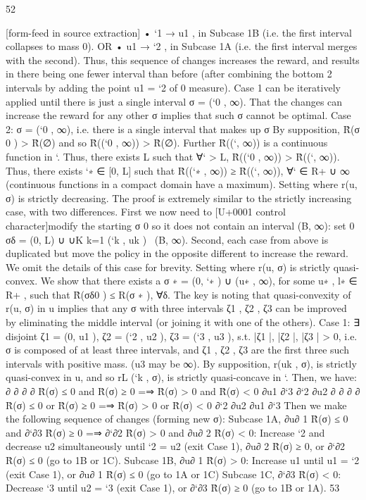 \documentclass[10pt]{article}
\begin{document}
\begin{ReviewVerbatim}
52


[form-feed in source extraction]
• `1 → u1 , in Subcase 1B (i.e. the first interval collapses to mass 0). OR
• u1 → `2 , in Subcase 1A (i.e. the first interval merges with the second).
Thus, this sequence of changes increases the reward, and results in there being one fewer interval
than before (after combining the bottom 2 intervals by adding the point u1 = `2 of 0 measure).
Case 1 can be iteratively applied until there is just a single interval σ = (`0 , ∞).
That the changes can increase the reward for any other σ implies that such σ cannot be optimal.
Case 2: σ = (`0 , ∞), i.e. there is a single interval that makes up σ
By supposition, R̂(σ 0 ) > R̂(∅) and so R̂((`0 , ∞)) > R̂(∅). Further R̂((`, ∞)) is a continuous
function in `. Thus, there exists L such that ∀` > L, R̂((`0 , ∞)) > R̂((`, ∞)).
Thus, there exists `∗ ∈ [0, L] such that R̂((`∗ , ∞)) ≥ R̂((`, ∞)), ∀` ∈ R+ ∪ {∞} (continuous
functions in a compact domain have a maximum).
Setting where r(u, σ) is strictly decreasing.
The proof is extremely similar to the strictly increasing case, with two differences.
First we now need to [U+0001 control character]modify the starting σ 0 so it does not contain an interval (B, ∞): set
0
σδ = (0, L) ∪ ∪K
k=1 (`k , uk ) \ (B, ∞).
Second, each case from above is duplicated but move the policy in the opposite different to
increase the reward. We omit the details of this case for brevity.
Setting where r(u, σ) is strictly quasi-convex.
We show that there exists a σ ∗ = (0, `∗ ) ∪ (u∗ , ∞), for some u∗ , l∗ ∈ R+ , such that R̂(σδ0 ) ≤
R(σ ∗ ), ∀δ.
The key is noting that quasi-convexity of r(u, σ) in u implies that any σ with three intervals
ζ1 , ζ2 , ζ3 can be improved by eliminating the middle interval (or joining it with one of the others).
Case 1: ∃ disjoint ζ1 = (0, u1 ), ζ2 = (`2 , u2 ), ζ3 = (`3 , u3 ), s.t. |ζ1 |, |ζ2 |, |ζ3 | > 0, i.e. σ is
composed of at least three intervals, and ζ1 , ζ2 , ζ3 are the first three such intervals with positive
mass. (u3 may be ∞).
By supposition, r(uk , σ), is strictly quasi-convex in u, and so rL (`k , σ), is strictly quasi-concave
in `.
Then, we have:
∂
∂
∂
∂
R̂(σ) ≤ 0 and
R̂(σ) ≥ 0 =⇒
R̂(σ) > 0 and
R̂(σ) < 0
∂u1
∂`3
∂`2
∂u2
∂
∂
∂
∂
R̂(σ) ≤ 0 or
R̂(σ) ≥ 0 =⇒
R̂(σ) > 0 or
R̂(σ) < 0
∂`2
∂u2
∂u1
∂`3
Then we make the following sequence of changes (forming new σ):
Subcase 1A, ∂u∂ 1 R̂(σ) ≤ 0 and ∂`∂3 R̂(σ) ≥ 0 =⇒ ∂`∂2 R̂(σ) > 0 and ∂u∂ 2 R̂(σ) < 0: Increase `2 and
decrease u2 simultaneously until `2 = u2 (exit Case 1), ∂u∂ 2 R̂(σ) ≥ 0, or ∂`∂2 R̂(σ) ≤ 0 (go to
1B or 1C).
Subcase 1B, ∂u∂ 1 R̂(σ) > 0: Increase u1 until u1 = `2 (exit Case 1), or ∂u∂ 1 R̂(σ) ≤ 0 (go to 1A or
1C)
Subcase 1C, ∂`∂3 R̂(σ) < 0: Decrease `3 until u2 = `3 (exit Case 1), or ∂`∂3 R̂(σ) ≥ 0 (go to 1B or
1A).
53



\end{ReviewVerbatim}
\end{document}
